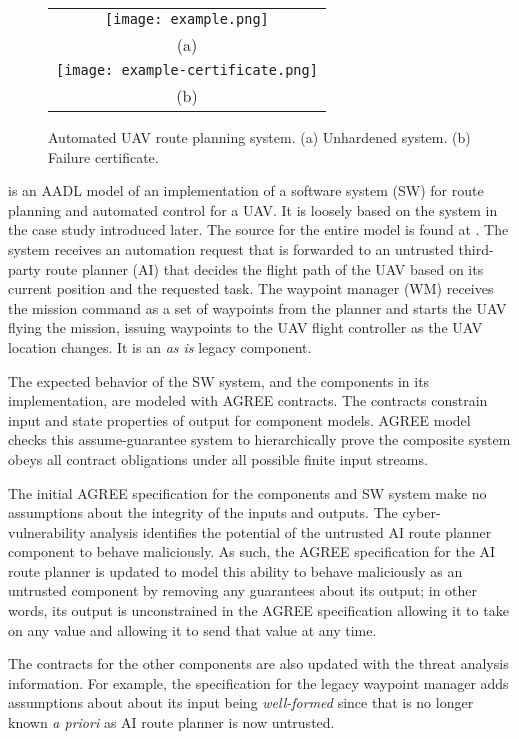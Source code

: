 \begin{figure*}
  \begin{center}
    \begin{tabular}{c}
      \texttt{[image: example.png]} \\
      (a) \\
      \texttt{[image: example-certificate.png]} \\
      (b)
    \end{tabular}
  \end{center}
\caption{Automated UAV route planning system. (a) Unhardened system. (b) Failure certificate.}
\label{fig:example}
\end{figure*}

 is an AADL model of an implementation of a software system (SW) for route planning and automated control for a UAV. It is loosely based on the system in the case study introduced later.  The source for the entire model is found at \cite{repo}. The system receives an automation request that is forwarded to an untrusted third-party route planner (AI) that decides the flight path of the UAV based on its current position and the requested task. The waypoint manager (WM) receives the mission command as a set of waypoints from the planner and starts the UAV flying the mission, issuing waypoints to the UAV flight controller as the UAV location changes. It is an \emph{as is} legacy component.

The expected behavior of the SW system, and the components in its implementation, are modeled with AGREE contracts. The contracts constrain input and state properties of output for component models. AGREE model checks this assume-guarantee system to hierarchically prove the composite system obeys all contract obligations under all possible finite input streams. 

The initial AGREE specification for the components and SW system make no assumptions about the integrity of the inputs and outputs. The cyber-vulnerability analysis identifies the potential of the untrusted AI route planner component to behave maliciously. As such, the AGREE specification for the AI route planner is updated to model this ability to behave maliciously as an untrusted component by removing any guarantees about its output; in other words, its output is unconstrained in the AGREE specification allowing it to take on any value and allowing it to send that value at any time.

The contracts for the other components are also updated with the threat analysis information. For example, the specification for the legacy waypoint manager adds assumptions about about its input being \emph{well-formed} since that is no longer known \emph{a priori} as AI route planner is now untrusted. 

